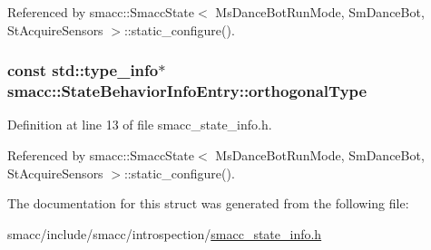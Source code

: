 Referenced by smacc\+::\+Smacc\+State$<$ Ms\+Dance\+Bot\+Run\+Mode, Sm\+Dance\+Bot, St\+Acquire\+Sensors $>$\+::static\+\_\+configure().

\subsubsection[{\texorpdfstring{orthogonal\+Type}{orthogonalType}}]{\setlength{\rightskip}{0pt plus 5cm}const std\+::type\+\_\+info$\ast$ smacc\+::\+State\+Behavior\+Info\+Entry\+::orthogonal\+Type}\hypertarget{structsmacc_1_1StateBehaviorInfoEntry_aefc43616f2bd059594b3b90d6ad47916}{}\label{structsmacc_1_1StateBehaviorInfoEntry_aefc43616f2bd059594b3b90d6ad47916}


Definition at line 13 of file smacc\+\_\+state\+\_\+info.\+h.



Referenced by smacc\+::\+Smacc\+State$<$ Ms\+Dance\+Bot\+Run\+Mode, Sm\+Dance\+Bot, St\+Acquire\+Sensors $>$\+::static\+\_\+configure().



The documentation for this struct was generated from the following file\+:\begin{DoxyCompactItemize}
\item 
smacc/include/smacc/introspection/\hyperlink{smacc__state__info_8h}{smacc\+\_\+state\+\_\+info.\+h}\end{DoxyCompactItemize}
